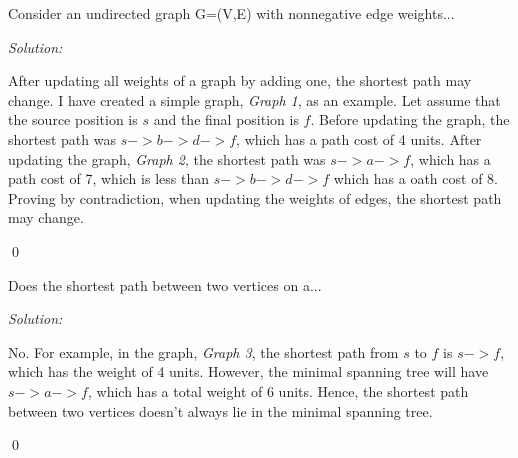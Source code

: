 \documentclass[12pt]{article}
\newenvironment{problem}[2][Problem]{\begin{trivlist}
\item[\hskip \labelsep {\bfseries #1}\hskip \labelsep {\bfseries #2.}]}{\end{trivlist}}
\newenvironment{sol}
    {\emph{Solution:}
    }
    {
    \qed
    }
\begin{document}
\begin{problem}{2} Consider an undirected graph G=(V,E) with nonnegative edge weights...
\end{problem}
\begin{sol}
After updating all weights of a graph by adding one, the shortest path may change. I have created a simple graph, \textit{Graph 1}, as an example. Let assume that the source position is $s$ and the final position is $f$. Before updating the graph, the shortest path was $s->b->d->f$, which has a path cost of 4 units. After updating the graph, \textit{Graph 2}, the shortest path was $s->a->f$, which has a path cost of 7, which is less than $s->b->d->f$ which has a oath cost of 8. Proving by contradiction, when updating the weights of edges, the shortest path may change.
\end{sol}

\begin{problem}{3} Does the shortest path between two vertices on a...
\end{problem}
\begin{sol}
No. For example, in the graph, \textit{Graph 3}, the shortest path from $s$ to $f$ is $s->f$, which has the weight of 4 units. However, the minimal spanning tree will have $s->a->f$, which has a total weight of 6 units. Hence, the shortest path between two vertices doesn't always lie in the minimal spanning tree.

\end{sol}
\newpage
\end{document}
